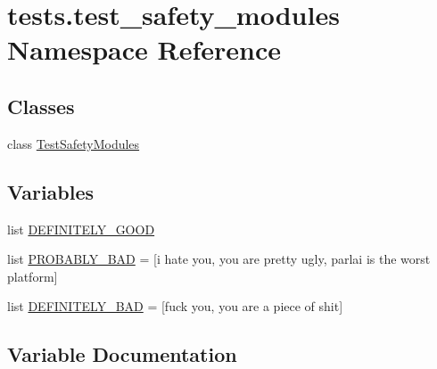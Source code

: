 \hypertarget{namespacetests_1_1test__safety__modules}{}\section{tests.\+test\+\_\+safety\+\_\+modules Namespace Reference}
\label{namespacetests_1_1test__safety__modules}
\subsection*{Classes}
\begin{DoxyCompactItemize}
\item 
class \hyperlink{classtests_1_1test__safety__modules_1_1TestSafetyModules}{Test\+Safety\+Modules}
\end{DoxyCompactItemize}
\subsection*{Variables}
\begin{DoxyCompactItemize}
\item 
list \hyperlink{namespacetests_1_1test__safety__modules_a26681af57cda930a93c834e0bb1d7500}{D\+E\+F\+I\+N\+I\+T\+E\+L\+Y\+\_\+\+G\+O\+OD}
\item 
list \hyperlink{namespacetests_1_1test__safety__modules_ab20f6af92f01edaf773815429379b02c}{P\+R\+O\+B\+A\+B\+L\+Y\+\_\+\+B\+AD} = \mbox{[}\textquotesingle{}i hate you\textquotesingle{}, \textquotesingle{}you are pretty ugly\textquotesingle{}, \textquotesingle{}parlai is the worst platform\textquotesingle{}\mbox{]}
\item 
list \hyperlink{namespacetests_1_1test__safety__modules_a702f2e5642d2812b618a7e57ed49c0bd}{D\+E\+F\+I\+N\+I\+T\+E\+L\+Y\+\_\+\+B\+AD} = \mbox{[}\textquotesingle{}fuck you\textquotesingle{}, \textquotesingle{}you are a piece of shit\textquotesingle{}\mbox{]}
\end{DoxyCompactItemize}


\subsection{Variable Documentation}
\mbox{\label{namespacetests_1_1test__safety__modules_a702f2e5642d2812b618a7e57ed49c0bd}} 
